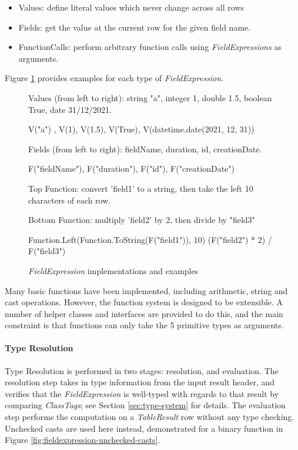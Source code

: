 \begin{itemize}
	\item Values: define literal values which never change across all rows
	\item Fields: get the value at the current row for the given field name.
	\item FunctionCalls: perform arbitrary function calls using \textit{FieldExpressions} as arguments.
\end{itemize}

Figure \ref{fig:field-expressions-examples} provides examples for each type of \textit{FieldExpression}.
\begin{figure}[htp]
	Values (from left to right): string "a", integer 1, double 1.5, boolean True, date 31/12/2021.
	\begin{python}
V("a") , V(1), V(1.5), V(True), V(datetime.date(2021, 12, 31))
	\end{python}

	Fields (from left to right): fieldName, duration, id, creationDate.
	\begin{python}
F("fieldName"), F("duration"), F("id"), F("creationDate")
	\end{python}

	Top Function: convert 'field1' to a string, then take the left 10 characters of each row.
	
	Bottom Function: multiply 'field2' by 2, then divide by "field3"
	\begin{python}
Function.Left(Function.ToString(F("field1")), 10)
(F("field2") * 2) / F("field3")
	\end{python}
	\caption{\textit{FieldExpression} implementations and examples}
	\label{fig:field-expressions-examples}
\end{figure}

Many basic functions have been implemented, including arithmetic, string and cast operations. However, the function system is designed to be extensible. A number of helper classes and interfaces are provided to do this, and the main constraint is that functions can only take the 5 primitive types as arguments.

\paragraph{Type Resolution} 
Type Resolution is performed in two stages: resolution, and evaluation. The resolution step takes in type information from the input result header, and verifies that the \textit{FieldExpression} is well-typed with regards to that result by comparing \textit{ClassTags}; see Section \ref{sec:type-system} for details. The evaluation step performs the computation on a \textit{TableResult} row without any type checking. Unchecked casts are used here instead, demonstrated for a binary function in Figure \ref{fig:fieldexpression-unchecked-casts}. 

